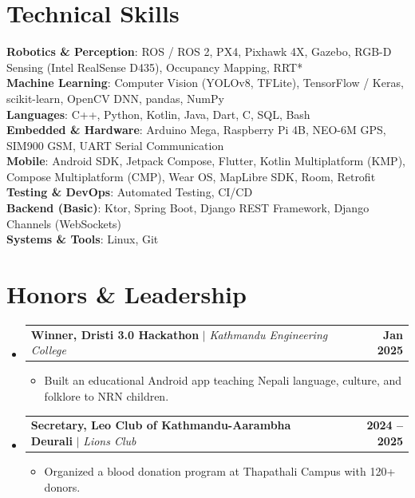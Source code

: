 \documentclass[letterpaper,11pt]{article}
\makeatletter
\newcommand{\resumeItem}[1]{
  \item\small{{#1 \vspace{-2pt}}}
}
\newcommand{\resumeProjectHeading}[2]{
    \item
    \begin{tabular*}{1.001\textwidth}{l@{\extracolsep{\fill}}r}
      \small#1 & \textbf{\small #2}\\
    \end{tabular*}\vspace{-7pt}
}
\newcommand{\resumeItemListStart}{\begin{itemize}}
\newcommand{\resumeItemListEnd}{\end{itemize}\vspace{-5pt}}
\newcommand{\resumeSubHeadingListStart}{\begin{itemize}[leftmargin=0.0in, label={}]}
\newcommand{\resumeSubHeadingListEnd}{\end{itemize}}
\newcommand{\projgap}{\vspace{-8pt}}        %
\newcommand{\sectiongap}{\vspace{0pt}}
\makeatother
\begin{document}
\section{Technical Skills}
 \begin{itemize}[leftmargin=0.15in, label={}]
    \small{\item{
     \textbf{Robotics \& Perception}{: ROS / ROS 2, PX4, Pixhawk 4X, Gazebo, RGB-D Sensing (Intel RealSense D435), Occupancy Mapping, RRT*} \\
     \vspace{3pt}
     \textbf{Machine Learning}{: Computer Vision (YOLOv8, TFLite), TensorFlow / Keras, scikit-learn, OpenCV DNN, pandas, NumPy} \\
     \vspace{3pt}
     \textbf{Languages}{: C++, Python, Kotlin, Java, Dart, C, SQL, Bash} \\
     \vspace{3pt}
     \textbf{Embedded \& Hardware}{: Arduino Mega, Raspberry Pi 4B, NEO-6M GPS, SIM900 GSM, UART Serial Communication} \\
     \vspace{3pt}
     \textbf{Mobile}{: Android SDK, Jetpack Compose, Flutter, Kotlin Multiplatform (KMP), Compose Multiplatform (CMP), Wear OS, MapLibre SDK, Room, Retrofit} \\
     \vspace{3pt}
     \textbf{Testing \& DevOps}{: Automated Testing, CI/CD} \\
     \vspace{3pt}
     \textbf{Backend (Basic)}{: Ktor, Spring Boot, Django REST Framework, Django Channels (WebSockets)} \\
     \vspace{3pt}
     \textbf{Systems \& Tools}{: Linux, Git}
    }}
 \end{itemize}
\vspace{-3pt}
\sectiongap

\section{Honors \& Leadership}
\vspace{-5pt}
\resumeSubHeadingListStart

    \resumeProjectHeading
      {\textbf{Winner, Dristi 3.0 Hackathon} $|$ \emph{Kathmandu Engineering College}}{Jan 2025}
    \resumeItemListStart
        \resumeItem{Built an educational Android app teaching Nepali language, culture, and folklore to NRN children.}
    \resumeItemListEnd
    \projgap

    \resumeProjectHeading
      {\textbf{Secretary, Leo Club of Kathmandu-Aarambha Deurali} $|$ \emph{Lions Club}}{2024 -- 2025}
    \resumeItemListStart
        \resumeItem{Organized a blood donation program at Thapathali Campus with 120+ donors.}
    \resumeItemListEnd

\resumeSubHeadingListEnd
\end{document}
